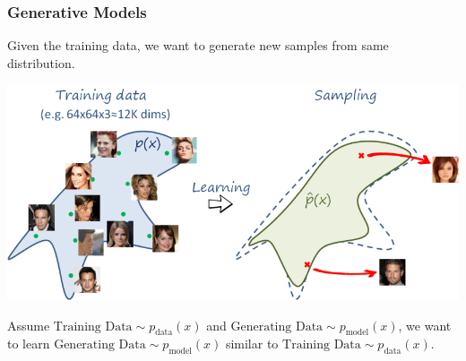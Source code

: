 \documentclass[aspectratio = 169]{beamer}
\begin{document}
\begin{frame}

\frametitle{Generative Models}

Given the training data, we want to generate new samples from same distribution.

\vspace{0.4cm}

\begin{centering}

\includegraphics[scale = 0.5]{Figures/generative.png}

\end{centering}

Assume $\text{Training Data} \sim p_{\text{data}} (x)$ and $\text{Generating Data} \sim p_{\text{model}} (x)$, we want to learn $\text{Generating Data} \sim p_{\text{model}} (x)$ similar to $\text{Training Data} \sim p_{\text{data}} (x)$.














\end{frame}
\end{document}
